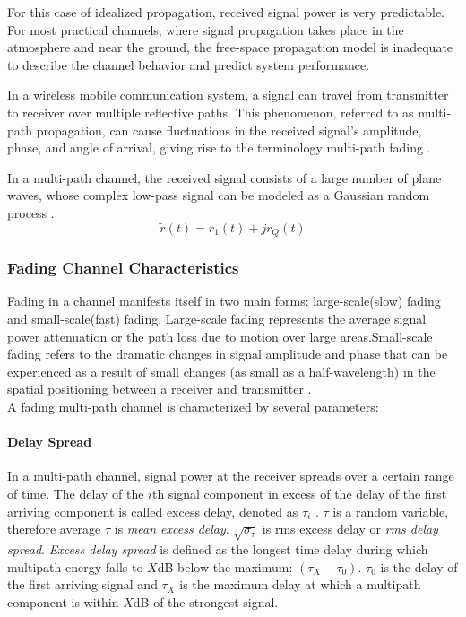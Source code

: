 For this case of idealized propagation, received signal power is very predictable. For most practical channels, where signal propagation takes place in the atmosphere and near the ground, the free-space propagation model is inadequate to describe the channel behavior and predict system performance.
 
In a wireless mobile communication system, a signal can travel from transmitter to receiver over multiple reflective paths. This phenomenon, referred to as multi-path propagation, can cause fluctuations in the received
signal’s amplitude, phase, and angle of arrival, giving rise to the terminology multi-path fading \cite{AWGN}.
  
In a multi-path channel, the received signal consists of a large number of plane waves, whose complex low-pass signal can be modeled as a Gaussian random process \cite{fuqin}.
$$ \tilde{r}(t)=r_{1}(t)+jr_{Q}(t) $$
\subsubsection{Fading Channel Characteristics} 
Fading in a channel manifests itself in two main forms: large-scale(slow) fading and small-scale(fast) fading. Large-scale fading represents the average signal power attenuation or the path loss due to motion over large areas.Small-scale fading refers to the dramatic changes in signal amplitude and phase that can be experienced as a result of small changes (as small as a half-wavelength) in the spatial positioning between a receiver and transmitter \cite{AWGN}.
\\A fading multi-path channel is characterized by several parameters: 

\paragraph{Delay Spread}
In a multi-path channel, signal power at the receiver spreads over a certain range of time. The delay of the $i$th signal component in excess of the delay of the first arriving component is called excess delay, denoted as $\tau_i$ \cite{fuqin}. $\tau$ is a random variable, therefore average $\bar{\tau}$ is \textit{mean excess delay}. $\sqrt{\sigma_\tau}$ is rms excess delay or \textit{rms delay spread}.
\textit{Excess delay spread} is defined as the longest time delay during which multipath energy falls to $X$dB below the maximum: $\left( \tau_X-\tau_0\right)$. $\tau_0$ is the delay of the first arriving signal and $\tau_X$ is the maximum delay at which a multipath component is within $X$dB of the strongest signal.

